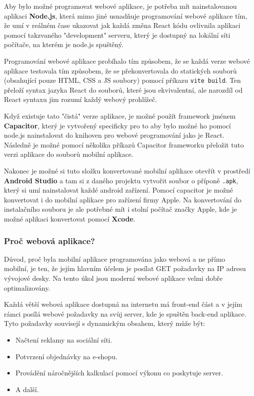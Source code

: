 Aby bylo možné programovat webové aplikace, je potřeba mít nainstalovanou aplikaci \textbf{Node.js}, která mimo jiné usnadňuje programování webové aplikace tím, že umí v reálném čase ukazovat jak každá změna React kódu ovlivnila aplikaci pomocí takzvaného "development" serveru, který je dostupný na lokální síti počítače, na kterém je node.js spuštěný.

Programování webové aplikace probíhalo tím způsobem, že se každá verze webové aplikace testovala tím způsobem, že se překonvertovala do statických souborů (obsahující pouze HTML, CSS a JS soubory) pomocí příkazu \texttt{vite build}. Ten přeloží syntax jazyka React do souborů, které jsou ekvivalentní, ale narozdíl od React syntaxu jim rozumí každý webový prohlížeč.

Když existuje tato "čistá" verze aplikace, je možné použít framework jménem \textbf{Capacitor}, který je vytvořený specificky pro to aby bylo možné ho pomocí node.js nainstalovat do knihoven pro webové programování jako je React. Následně je možné pomocí několika příkazů Capacitor frameworku přeložit tuto verzi aplikace do souborů mobilní aplikace.
\cite{CapacitorDocs}

Nakonec je možné si tuto složku konvertované mobilní aplikace otevřít v prostředí \textbf{Android Studio} a tam si z daného projektu vytvořit soubor o příponě \texttt{.apk}, který si umí nainstalovat každé android zařízení. Pomocí capacitor je možné konvertovat i do mobilní aplikace pro zařízení firmy Apple. Na konvertování do instalačního souboru je ale potřebné mít i stolní počítač značky Apple, kde je možné aplikaci konvertovat pomocí \textbf{Xcode}.

\subsubsection{Proč webová aplikace?}\label{sec:ProcWebovaAplikace}
Důvod, proč byla mobilní aplikace programována jako webová a ne přímo mobilní, je ten, že jejím hlavním účelem je posílat GET požadavky na IP adresu vývojové desky. Na tento úkol jsou moderní webové aplikace velmi dobře optimalizovány.

Každá větší webová aplikace dostupná na internetu má front-end část a v jejím rámci posílá webové požadavky na svůj server, kde je spuštěn back-end aplikace. Tyto požadavky souvisejí s dynamickým obsahem, který může být:
\begin{itemize}
	\item Načtení reklamy na sociální síti.
	\item Potvrzení objednávky na e-shopu.
	\item Provádění náročnějších kalkulací pomocí výkonu co poskytuje server.
	\item A další.
\end{itemize}

